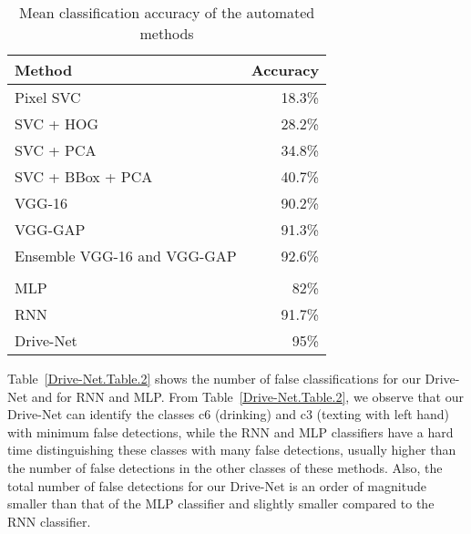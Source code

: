 \begin{table}[]
\centering
\caption{Mean classification accuracy of the automated methods}%
\label{Drive-Net.Table.1}
\begin{tabular}{@{}lr@{}}
\toprule
\textbf{Method}             & \textbf{Accuracy} \\ \midrule
Pixel SVC                   & 18.3\%            \\
SVC + HOG                   & 28.2\%            \\
SVC + PCA                   & 34.8\%            \\
SVC + BBox + PCA            & 40.7\%            \\
VGG-16                      & 90.2\%            \\
VGG-GAP                     & 91.3\%            \\
Ensemble VGG-16 and VGG-GAP & 92.6\%            \\
\multicolumn{2}{l}{\cellcolor[HTML]{C0C0C0}}    \\
MLP                         & 82\%              \\
RNN                         & 91.7\%            \\
Drive-Net                   & 95\%              \\ \bottomrule
\end{tabular}
\end{table}

Table~\ref{Drive-Net.Table.2} shows the number of false classifications for our Drive-Net and for RNN and MLP\@. From Table~\ref{Drive-Net.Table.2}, we observe that our Drive-Net can identify the classes c6 (drinking) and c3 (texting with left hand) with minimum false detections, while the RNN and MLP classifiers have a hard time distinguishing these classes with many false detections, usually higher than the number of false detections in the other classes of these methods. Also, the total number of false detections for our Drive-Net is an order of magnitude smaller than that of the MLP classifier and slightly smaller compared to the RNN classifier.

